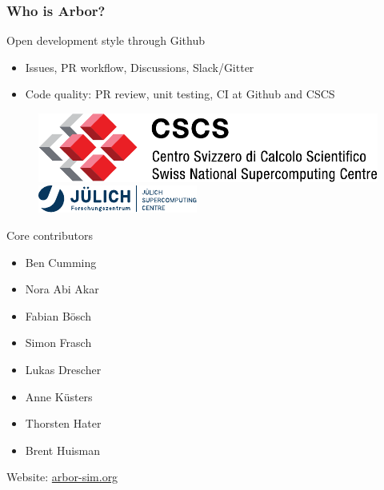 \documentclass[t]{beamer}
\begin{document}
\begin{frame}
    \frametitle{Who is Arbor?}

    Open development style through Github
    \begin{itemize}
        \item Issues, PR workflow, Discussions, Slack/Gitter
        \item Code quality: PR review, unit testing, CI at Github and CSCS
    \end{itemize}

    \begin{figure}
        \begin{center}
            \includegraphics[width=\linewidth]{cscs_logo.pdf}
        \end{center}
        \vspace{0.1\baselineskip}
        \begin{center}
            \includegraphics[width=\linewidth]{Logo_FZJ_JSC.pdf}
        \end{center}
    \end{figure}

    Core contributors
    \begin{itemize}
        \item Ben Cumming
        \item Nora Abi Akar
        \item Fabian Bösch 
        \item Simon Frasch
        \item Lukas Drescher
        \item Anne Küsters
        \item Thorsten Hater
        \item Brent Huisman
    \end{itemize}

    Website: \url{arbor-sim.org}

\end{frame}
\end{document}
